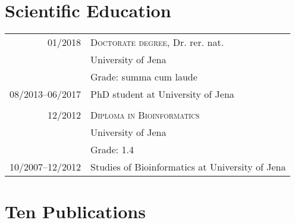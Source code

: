 \documentclass[a4paper,10pt]{article} %
\begin{document}
\section{Scientific Education}

\begin{tabular}{r|l}	
01/2018 							& \textsc{Doctorate degree}, Dr. rer. nat. \\
									& University of Jena \\
									& Grade: summa cum laude \\ 
\footnotesize{08/2013--06/2017} 	& \footnotesize{PhD student at University of Jena}\\

\multicolumn{2}{c}{} \\	%

12/2012 							& \textsc{Diploma in Bioinformatics}\\
          							& University of Jena  \\
          							& Grade: 1.4 \\
\footnotesize{10/2007--12/2012} 	& \footnotesize{Studies of Bioinformatics at University of Jena}\\
\end{tabular}

%	
%
\section{Ten Publications}  
\end{document}
